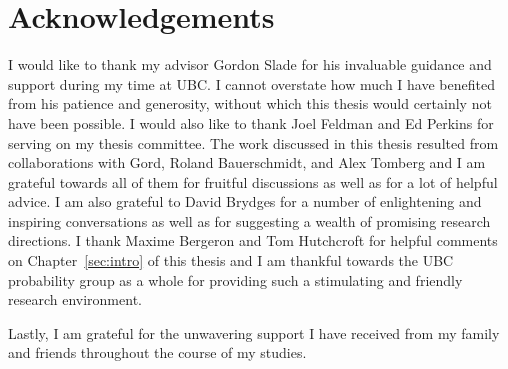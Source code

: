 \cleardoublepage

\tableofcontents                  %

\cleardoublepage

{%
\let\oldnumberline\numberline%
\renewcommand{\numberline}{\figurename~\oldnumberline}%
\listoffigures%
}

\cleardoublepage



\chapter{Acknowledgements}      %
I would like to thank my advisor Gordon Slade for his invaluable guidance and support
during my time at UBC. I cannot overstate how much I have benefited
from his patience and generosity, without which this thesis would certainly not have
been possible. I would also like to thank Joel Feldman and Ed Perkins for serving on my
thesis committee. The work discussed in this thesis resulted from collaborations with
Gord, Roland Bauerschmidt, and Alex Tomberg and I am grateful towards all of them for
fruitful discussions as well as for a lot of helpful advice. I am also grateful
to David Brydges for a number of enlightening and inspiring conversations as well as for
suggesting a wealth of promising research directions. I thank Maxime Bergeron and
Tom Hutchcroft for helpful comments on Chapter~\ref{sec:intro} of this thesis and I am
thankful towards the UBC probability group as a whole for providing such a stimulating
and friendly research environment.

Lastly, I am grateful for the unwavering support I have received from my family and friends
throughout the course of my studies.
